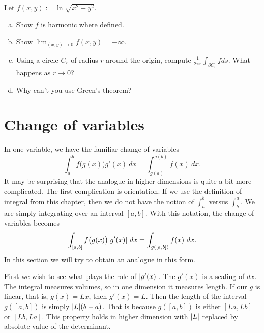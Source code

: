\begin{exercise}
Let $f(x,y) := \ln \sqrt{x^2+y^2}$.
\begin{enumerate}[a)]
\item
Show $f$ is harmonic where defined.
\item
Show $\lim_{(x,y) \to 0} f(x,y) = -\infty$.
\item
Using a circle $C_r$ of radius
$r$ around the origin, compute $\frac{1}{2\pi r} \int_{\partial C_r} f ds$.
What happens as $r \to 0$?
\item
Why can't you use Green's theorem?
\end{enumerate}
\end{exercise}



\sectionnewpage
\section{Change of variables}
\label{sec:mvchangeofvars}


In one variable, we have the familiar change of variables
\begin{equation*}
\int_a^b f\bigl(g(x)\bigr) g'(x)~ dx = 
\int_{g(a)}^{g(b)} f(x) ~ dx .
\end{equation*}
It may be surprising that the analogue in higher dimensions is quite
a bit more complicated.  The first complication is orientation.  If we use
the definition of integral from this chapter, then we do not have the notion
of $\int_a^b$ versus $\int_b^a$.  We are simply integrating over an
interval $[a,b]$.  With this notation, the change of variables becomes
\begin{equation*}
\int_{[a,b]} f\bigl(g(x)\bigr) \lvert {g'(x)} \rvert~ dx = 
\int_{g([a,b])} f(x) ~ dx .
\end{equation*}
In this section we will try to obtain an analogue in this form.

First we wish to see what plays the role of $\lvert {g'(x)} \rvert$.  
The $g'(x)$ is a scaling of $dx$.  The integral measures volumes, so in one
dimension it measures length.  If our $g$ is linear, that is, $g(x)=Lx$, then
$g'(x) = L$.  Then the length of the interval $g([a,b])$ is simply
$\lvert {L} \rvert(b-a)$.  That is because $g([a,b])$ is either $[La,Lb]$ or
$[Lb,La]$.  This property holds in higher dimension with $\lvert {L} \rvert$ replaced
by absolute value of the determinant.

